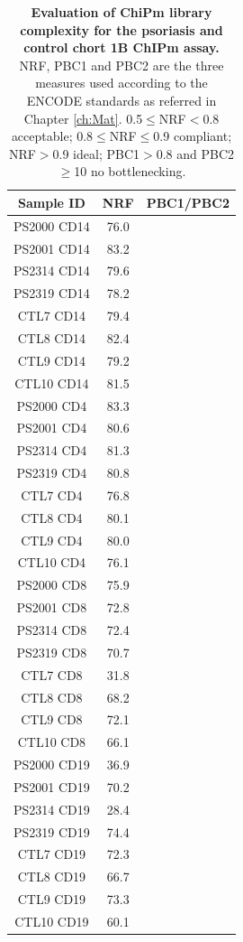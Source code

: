 \begin{table}[htbp]
\centering
\begin{tabular}{@{} c c c}
\toprule
\textbf{Sample ID} & \textbf{NRF} & \textbf{PBC1/PBC2} \\
\midrule
\midrule
PS2000 CD14	& 76.0	& \\
PS2001 CD14	& 83.2	& \\
PS2314 CD14	& 79.6	& \\
PS2319 CD14	& 78.2	& \\
CTL7 CD14	  & 79.4	& \\
CTL8 CD14	  & 82.4	& \\
CTL9 CD14	  & 79.2	& \\
CTL10 CD14	& 81.5	& \\
\midrule
PS2000 CD4  & 83.3	& \\
PS2001 CD4	& 80.6	& \\
PS2314 CD4	& 81.3	& \\
PS2319 CD4	& 80.8	& \\
CTL7 CD4	  & 76.8	& \\
CTL8 CD4    & 80.1	& \\
CTL9 CD4    & 80.0	& \\
CTL10 CD4   & 76.1	& \\
\midrule
PS2000 CD8 & 75.9 &	\\
PS2001 CD8 & 72.8 &	\\
PS2314 CD8 & 72.4 &	\\
PS2319 CD8 & 70.7 &	\\
CTL7 CD8	 & 31.8 &\\
CTL8 CD8	 & 68.2 &	\\
CTL9 CD8	 & 72.1 &	\\
CTL10 CD8	 & 66.1 &	\\
\midrule
PS2000 CD19	& 36.9 &\\
PS2001 CD19	& 70.2 &\\
PS2314 CD19	& 28.4 &	\\
PS2319 CD19	& 74.4 &	\\
CTL7	CD19  & 72.3	&\\
CTL8	CD19  & 66.7  &	\\
CTL9	CD19  & 73.3  &	\\
CTL10	CD19  & 60.1  &\\
\bottomrule
\end{tabular}
\medskip %
\caption[Evaluation of ChiPm library complexity for the psoriasis and control chort 1B ChIPm assay.]{\textbf{Evaluation of ChiPm library complexity for the psoriasis and control chort 1B ChIPm assay.} NRF, PBC1 and PBC2 are the three measures used according to the ENCODE standards as referred in Chapter \ref{ch:Mat}. 0.5$\leq$NRF$<$0.8 acceptable; 0.8$\leq$NRF$\leq$0.9 compliant; NRF$>$0.9 ideal; PBC1$>$0.8 and PBC2$\geq$10 no bottlenecking.}
\label{tab:ChIPm_PS_CTL_library_complexity}
\end{table}
\bigskip %



